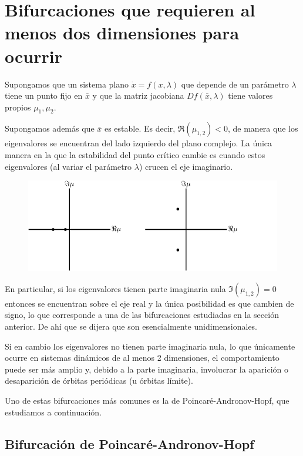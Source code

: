\section{Bifurcaciones que requieren al menos dos dimensiones para ocurrir}

Supongamos que un sistema plano $\dot{x} = f(x, \lambda)$ que depende de un parámetro $\lambda$ tiene un punto fijo en $\bar{x}$ y que la matriz jacobiana $Df(\bar{x}, \lambda)$ tiene valores propios $\mu_1, \mu_2$.

Supongamos además que $\bar{x}$ es estable. Es decir, $\Re(\mu_{1,2}) < 0$, de manera que los eigenvalores se encuentran del lado izquierdo del plano complejo.
La única manera en la que la estabilidad del punto crítico cambie es cuando estos eigenvalores (al variar el parámetro $\lambda$) crucen el eje imaginario.

\begin{figure}[ht] \centering
    \includegraphics[scale=1.0]{figures/bifurcations-2dimensional.pdf}
\end{figure}

En particular, si los eigenvalores tienen parte imaginaria nula $\Im(\mu_{1,2}) = 0$ entonces se encuentran sobre el eje real y la única posibilidad es que cambien de signo, lo que corresponde a una de las bifurcaciones estudiadas en la sección anterior.
De ahí que se dijera que son esencialmente unidimensionales.

Si en cambio los eigenvalores no tienen parte imaginaria nula, lo que únicamente ocurre en sistemas dinámicos de al menos 2 dimensiones, el comportamiento puede ser más amplio y, debido a la parte imaginaria, involucrar la aparición o desaparición de órbitas periódicas (u órbitas límite).

Uno de estas bifurcaciones más comunes es la de Poincaré-Andronov-Hopf, que estudiamos a continuación.

\subsection{Bifurcación de Poincaré-Andronov-Hopf}

